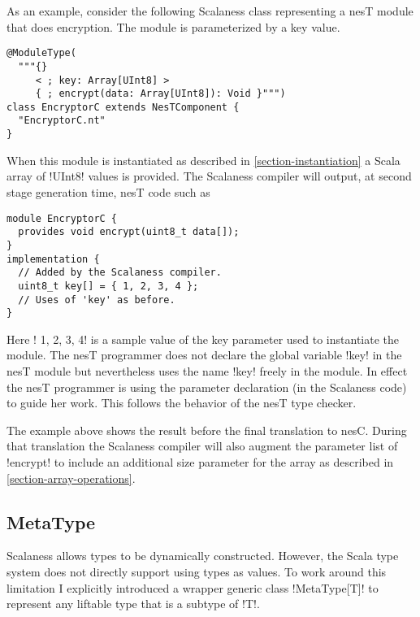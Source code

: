 As an example, consider the following Scalaness class representing a nesT module that does
encryption. The module is parameterized by a key value.

\singlespace
\vspace{1.0ex}
\begin{lstlisting}[language=scalaness]
@ModuleType(
  """{}
     < ; key: Array[UInt8] >
     { ; encrypt(data: Array[UInt8]): Void }""")
class EncryptorC extends NesTComponent {
  "EncryptorC.nt"
}
\end{lstlisting}
\vspace{1.0ex}
\primaryspacing

When this module is instantiated as described in \autoref{section-instantiation} a Scala array
of !UInt8! values is provided. The Scalaness compiler will output, at second stage generation
time, nesT code such as

\singlespace
\vspace{1.0ex}
\begin{lstlisting}[language=nesC]
module EncryptorC {
  provides void encrypt(uint8_t data[]);
}
implementation {
  // Added by the Scalaness compiler.
  uint8_t key[] = { 1, 2, 3, 4 };
  // Uses of 'key' as before.
}
\end{lstlisting}
\vspace{1.0ex}
\primaryspacing

Here !{ 1, 2, 3, 4}! is a sample value of the key parameter used to instantiate the module. The
nesT programmer does not declare the global variable !key! in the nesT module but nevertheless
uses the name !key! freely in the module. In effect the nesT programmer is using the parameter
declaration (in the Scalaness code) to guide her work. This follows the behavior of the nesT
type checker.

The example above shows the result before the final translation to nesC. During that translation
the Scalaness compiler will also augment the parameter list of !encrypt! to include an
additional size parameter for the array as described in \autoref{section-array-operations}.


\subsection{MetaType}
\label{section-metatype}

Scalaness allows types to be dynamically constructed. However, the Scala type system does not
directly support using types as values. To work around this limitation I explicitly introduced a
wrapper generic class !MetaType[T]! to represent any liftable type that is a subtype of !T!.

